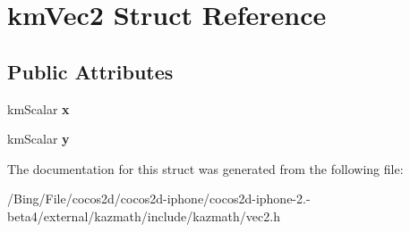 \hypertarget{structkm_vec2}{\section{km\-Vec2 Struct Reference}
\label{structkm_vec2}
}
\subsection*{Public Attributes}
\begin{DoxyCompactItemize}
\item 
\hypertarget{structkm_vec2_a8f17399ac844ce3b973d09d28e78429a}{km\-Scalar {\bfseries x}}\label{structkm_vec2_a8f17399ac844ce3b973d09d28e78429a}

\item 
\hypertarget{structkm_vec2_a21eee8f77413b24dd6a8a19314d61fed}{km\-Scalar {\bfseries y}}\label{structkm_vec2_a21eee8f77413b24dd6a8a19314d61fed}

\end{DoxyCompactItemize}


The documentation for this struct was generated from the following file\-:\begin{DoxyCompactItemize}
\item 
/\-Bing/\-File/cocos2d/cocos2d-\/iphone/cocos2d-\/iphone-\/2.-\/beta4/external/kazmath/include/kazmath/vec2.\-h\end{DoxyCompactItemize}
